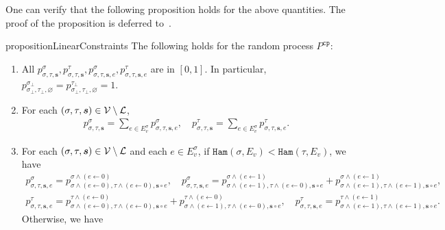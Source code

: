 \documentclass[11pt]{article}
\def\!#1{\mathtt{#1}}
\newcommand{\seqS}{\boldsymbol{s}}
\begin{document}
    
One can verify that the following proposition holds for the above quantities. The proof of the proposition is deferred to~.


    \begin{restatable}{proposition}{LinearConstraints}\label{prop:coupling-linear-constraint}
    The following holds for the random process $P^{\!{cp}}$:
        \begin{enumerate}[(1)]
            \item All $p^{\sigma}_{\sigma, \tau, \seqS}, p^{\tau}_{\sigma, \tau, \seqS},p^{\sigma}_{\sigma, \tau, \seqS,e}, p^{\tau}_{\sigma, \tau, \seqS,e}$ are in $[0, 1]$. 
            In particular, $p^{\sigma_\bot}_{\sigma_\bot, \tau_\bot, \varnothing} = p^{\tau_\bot}_{\sigma_\bot, \tau_\bot, \varnothing} = 1$.
            \item For each $(\sigma, \tau, \seqS)\in \+V\setminus\+L$, 
            \begin{align}\label{eqn-inter-sum1}
               p^{\sigma}_{\sigma,\tau,\seqS} = \sum_{e \in E_v^{\sigma}} p^{\sigma}_{\sigma, \tau, \seqS, e}, \quad  p^{\tau}_{\sigma,\tau,\seqS}=\sum_{e \in  E_v^{\sigma}} p^{\tau}_{\sigma,\tau, \seqS, e}.
            \end{align}
            \item For each $(\sigma, \tau, \seqS)\in \+V\setminus\+L$ and each $e\in E_v^{\sigma}$, if {${\!{Ham}\left(\sigma, {E_v}\right)} < {\!{Ham}\left(\tau,{E_v}\right)}$}, we have 
            \begin{align}\label{eqn-inner-child-sum1}
                p^{\sigma}_{\sigma,\tau, \seqS,e} = p^{\sigma \land (e\gets 0)}_{\sigma \land (e\gets 0),\tau\land (e\gets 0), \seqS \circ e}, \quad  p^{\sigma}_{\sigma, \tau, \seqS, e}=p^{\sigma\land (e\gets 1)}_{\sigma\land (e\gets 1),\tau\land (e\gets 0), \seqS\circ e} + p^{\sigma\land (e\gets 1)}_{\sigma\land (e\gets 1),\tau\land (e\gets 1),\seqS \circ e},
            \end{align}
            \begin{align}\label{eqn-inner-child-sum2}
                p^{\tau}_{\sigma, \tau, \seqS, e} = p^{\tau \land (e \gets 0)}_{\sigma \land (e\gets 0),\tau\land (e\gets 0), \seqS \circ e} + p^{\tau\land (e\gets 0)}_{\sigma\land (e\gets 1),\tau\land (e\gets 0), \seqS \circ e}, \quad  p^{\tau}_{\sigma, \tau, \seqS, e}=p^{\tau \land (e\gets 1)}_{\sigma \land (e\gets 1), \tau\land (e \gets 1), \seqS\circ e}.
            \end{align}
            Otherwise, we have
            \begin{align}\label{eqn-inner-child-sum3}

\end{align}
\end{enumerate}
\end{restatable}
\end{document}
